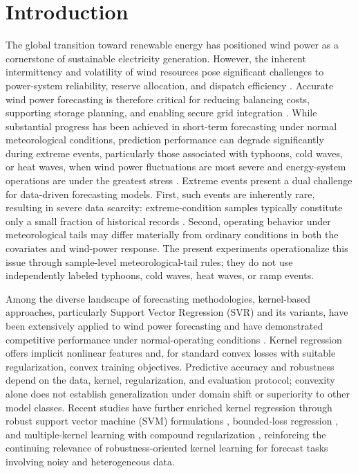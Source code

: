 \documentclass[a4paper]{cas-sc}
\begin{document}
\maketitle

\section{Introduction}

The global transition toward renewable energy has positioned wind power as a cornerstone of sustainable electricity generation. However, the inherent intermittency and volatility of wind resources pose significant challenges to power-system reliability, reserve allocation, and dispatch efficiency \citep{yuan2023conditional}. Accurate wind power forecasting is therefore critical for reducing balancing costs, supporting storage planning, and enabling secure grid integration \citep{yan2025economic, wang2025ensemble}. While substantial progress has been achieved in short-term forecasting under normal meteorological conditions, prediction performance can degrade significantly during extreme events, particularly those associated with typhoons, cold waves, or heat waves, when wind power fluctuations are most severe and energy-system operations are under the greatest stress \citep{wang2024scarcity, liu2024extreme, liu2025diffusion}.
Extreme events present a dual challenge for data-driven forecasting models. First, such events are inherently rare, resulting in severe data scarcity: extreme-condition samples typically constitute only a small fraction of historical records \citep{s41597-022-01696-6, wang2024scarcity}. {\color{blue}Second, operating behavior under meteorological tails may differ materially from ordinary conditions in both the covariates and wind-power response. The present experiments operationalize this issue through sample-level meteorological-tail rules; they do not use independently labeled typhoons, cold waves, heat waves, or ramp events.}

Among the diverse landscape of forecasting methodologies, kernel-based approaches, particularly Support Vector Regression (SVR) and its variants, have been extensively applied to wind power forecasting and have demonstrated competitive performance under normal-operating conditions \citep{wang2019review, zeng2011svmwind, li2021cuckoo, yuan2022jellyfish}. {\color{blue}Kernel regression offers implicit nonlinear features and, for standard convex losses with suitable regularization, convex training objectives. Predictive accuracy and robustness depend on the data, kernel, regularization, and evaluation protocol; convexity alone does not establish generalization under domain shift or superiority to other model classes.} Recent studies have further enriched kernel regression through robust support vector machine (SVM) formulations \citep{trafalis2006robust}, bounded-loss regression \citep{fu2023bounded}, and multiple-kernel learning with compound regularization \citep{jiang2021rlmkl}, reinforcing the continuing relevance of robustness-oriented kernel learning for forecast tasks involving noisy and heterogeneous data.
\end{document}
